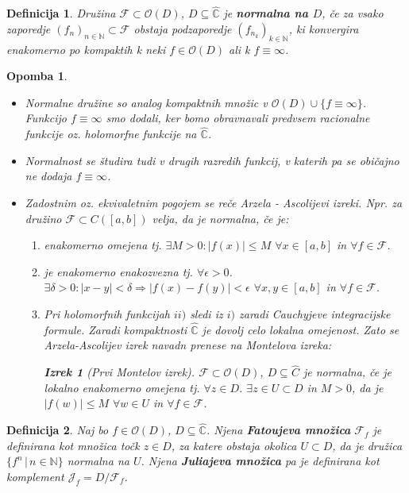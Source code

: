 \documentclass{article}
\newtheorem{definicija}{Definicija}
\newtheorem{opomba}{Opomba}
\newtheorem{izrek}{Izrek}
\newcommand{\C}{\mathbb{C}}
\newcommand{\N}{\mathbb{N}}
\newcommand{\F}{\mathcal{F}}
\newcommand{\Ho}{\mathcal{O}}
\begin{document}
\begin{definicija}
Družina $\F \subset \Ho(D)$, $D \subseteq \hat{\C}$ je 
\textbf{normalna na $D$}, če za vsako zaporedje $(f_n)_{n\in \N} 
\subset \F$ obstaja podzaporedje $(f_{n_k})_{k\in\N}$, ki konvergira enakomerno po 
kompaktih k neki $f\in \Ho(D)$ ali k $f\equiv \infty$.
\end{definicija}

\begin{opomba}
\hfill
\begin{itemize}
\item Normalne družine so analog kompaktnih množic v $\Ho(D) \cup \{f \equiv \infty\}$. 
Funkcijo $f \equiv \infty$ smo dodali, ker bomo obravnavali predvsem racionalne 
funkcije oz. holomorfne funkcije na $\hat{\C}$.
\item Normalnost se študira tudi v drugih razredih funkcij, v katerih pa se običajno ne dodaja $f\equiv \infty$.
\item Zadostnim oz. ekvivaletnim pogojem se reče Arzela - Ascolijevi izreki. Npr. za družino $\F \subset C([a, b])$ velja, da je normalna, če je:
\begin{enumerate}
\item[i)] enakomerno omejena tj. $\exists M > 0: |f(x)| \leq M$ $\forall x\in [a, b]$ in $\forall f\in \F$.
\item[ii)] je enakomerno enakozvezna tj. $\forall \epsilon > 0$. $\exists \delta > 0: |x - y| < \delta \Longrightarrow |f(x) - f(y)| < \epsilon$ $\forall x, y\in [a, b]$ in $\forall f\in \F$.
\item[iii)] Pri holomorfnih funkcijah $ii)$ sledi iz $i)$ zaradi Cauchyjeve integracijske formule. Zaradi kompaktnosti $\hat{\C}$ je dovolj celo lokalna omejenost. Zato se Arzela-Ascolijev izrek navadn prenese na Montelova izreka:
\begin{izrek}[Prvi Montelov izrek]
$\F \subset \Ho(D)$, $D\subseteq \hat{C}$ je normalna, če je lokalno enakomerno omejena tj. $\forall z\in D$. $\exists z\in U \subset D $ in $M > 0$, da je $|f(w)| \leq M$ $\forall w\in U$ in $\forall f\in \F$.
\end{izrek}
\end{enumerate}
\end{itemize}
\end{opomba}

\begin{definicija}
Naj bo $f \in \Ho(D)$, $D\subseteq \hat{\C}$. Njena 
\textbf{Fatoujeva množica} $\F_f$ je definirana kot množica točk
 $z\in D$, za katere obstaja okolica $U\subset D$, da je družica 
 $\{f^n \,|\, n\in \N\}$ normalna na $U$. Njena 
 \textbf{Juliajeva množica} pa je definirana kot komplement 
 $\mathcal{J}_f = D\slash \F_f$.
\end{definicija}
\end{document}
